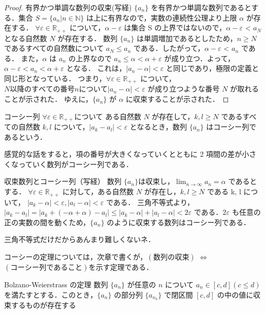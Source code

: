 \documentclass[a4paper]{ltjsarticle}
\newcommand{\seq}[1]{\{#1\}}
\begin{document}
\begin{proof}{有界かつ単調な数列の収束(写経)}{}
$\{a_n\}$ を有界かつ単調な数列であるとする．集合 $S = \{a_n | n \in \mathbb{N}\}$ は上に有界なので，実数の連続性公理より上限 $\alpha$ が存在する．
$\forall \varepsilon \in \mathbb{R_{++}}$ について，$\alpha - \varepsilon$ は集合 S の上界ではないので，$\alpha - \varepsilon$ < $a_N$ となる自然数 $N$ が存在する．
数列 $\{a_n\}$ は単調増加であるとしたため，$n \geq N$ であるすべての自然数について $a_N \leq a_n$ である．したがって，$\alpha - \varepsilon$ < $a_n$ である．
また，$\alpha$ は $a_n$ の上界なので $a_n \leq \alpha < \alpha + \varepsilon$ が成り立つ．よって，$\alpha - \varepsilon < a_n < \alpha + \varepsilon$ となる．
これは，$|a_n - \alpha| < \varepsilon$ と同じであり，極限の定義と同じ形となっている．
つまり，$\forall \varepsilon \in \mathbb{R_{++}}$ について，$N 以降のすべての番号 n について |a_n - \alpha| < \varepsilon$ が成り立つような番号 $N$ が取れることが示された．
ゆえに，$\{a_n\}$ が $\alpha$ に収束することが示された．
\end{proof}

\begin{tcb}{コーシー列}{}
$\forall \varepsilon \in \mathbb{R_{++}}$について ある自然数 $N$ が存在して，$k, l \geq N$ であるすべての自然数 $k, l$
について，$|a_k - a_l| < \varepsilon$ となるとき，数列 $\{a_n\}$ はコーシー列であるという．
\end{tcb}
感覚的な話をすると，項の番号が大きくなっていくとともに 2 項間の差が小さくなっていく数列がコーシー列である．

\begin{theorem}{収束数列とコーシー列（写経）}{}
数列 $\{a_n\} は収束し，\lim_{n \rightarrow \infty} a_n = \alpha$ であるとする．
$\forall\varepsilon \in \mathbb{R_{++}}$ に対して，ある自然数 $N$ が存在し，$k, l \geq N$ である \forall k, \forall l について，
$|a_k - \alpha| < \varepsilon, |a_l - \alpha| < \varepsilon$ である．
三角不等式より，$|a_k - a_l| = |a_k + (-\alpha + \alpha) - a_l| \leq |a_k - \alpha| + |a_l - \alpha| < 2 \varepsilon$
である．$2\varepsilon$ も任意の正の実数の間を動くため，$\{a_n\}$ のように収束する数列はコーシー列である．
\end{theorem}
三角不等式だけだからあんまり難しくないネ．

コーシーの定理については，次章で書くが，$(数列の収束)$ $\Leftrightarrow$ $(コーシー列であること)$を示す定理である．

\begin{theorem}{Bolzano-Weierstrass の定理}{}
数列 $\seq{a_n}$ が任意の $n$ について $a_n \in [c, d] (c \leq d)$を満たすとする．このとき，$\seq{a_n}$ の部分列 $\seq{a_{n_k}}$ で閉区間 $[c, d]$ の中の値に収束するものが存在する
\end{theorem}
\end{document}
